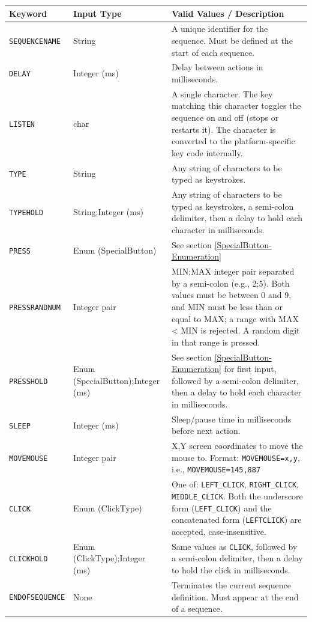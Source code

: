 \begin{table}[h]
	\centering
	\label{tab:sequencer_keywords}
	\begin{tabularx}{\textwidth}{|l|l|X|}
		\hline
		\textbf{Keyword} & \textbf{Input Type} & \textbf{Valid Values / Description} \\
		\hline
		\texttt{SEQUENCENAME} & String & A unique identifier for the sequence. Must be defined at the start of each sequence. \\
		\hline
		\texttt{DELAY} & Integer (ms) & Delay between actions in milliseconds.  \\
		\hline
		\texttt{LISTEN} & char & A single character. The key matching this character toggles the sequence on and off (stops or restarts it). The character is converted to the platform-specific key code internally. \\
		\hline
		\texttt{TYPE} & String & Any string of characters to be typed as keystrokes. \\
		\hline
		\texttt{TYPEHOLD} & String;Integer (ms) & Any string of characters to be typed as keystrokes, a semi-colon delimiter, then a delay to hold each character in milliseconds. \\
		\hline
		\texttt{PRESS} & Enum (SpecialButton) & See section \ref{SpecialButton-Enumeration}\\
		\hline
		\texttt{PRESSRANDNUM} & Integer pair & MIN;MAX integer pair separated by a semi-colon (e.g., 2;5). Both values must be between 0 and 9, and MIN must be less than or equal to MAX; a range with MAX < MIN is rejected. A random digit in that range is pressed. \\
		\hline
		\texttt{PRESSHOLD} & Enum (SpecialButton);Integer (ms) & See section \ref{SpecialButton-Enumeration} for first input, followed by a semi-colon delimiter, then a delay to hold each character in milliseconds.\\
		\hline
		\texttt{SLEEP} & Integer (ms) & Sleep/pause time in milliseconds before next action. \\
		\hline
		\texttt{MOVEMOUSE} & Integer pair & X,Y screen coordinates to move the mouse to. Format: \texttt{MOVEMOUSE=x,y}, i.e., \texttt{MOVEMOUSE=145,887} \\
		\hline
		\texttt{CLICK} & Enum (ClickType) & One of: \texttt{LEFT\_CLICK}, \texttt{RIGHT\_CLICK}, \texttt{MIDDLE\_CLICK}. Both the underscore form (\texttt{LEFT\_CLICK}) and the concatenated form (\texttt{LEFTCLICK}) are accepted, case-insensitive. \\
		\hline
		\texttt{CLICKHOLD} & Enum (ClickType);Integer (ms) & Same values as \texttt{CLICK}, followed by a semi-colon delimiter, then a delay to hold the click in milliseconds. \\
		\hline
		\texttt{ENDOFSEQUENCE} & None & Terminates the current sequence definition. Must appear at the end of a sequence. \\
		\hline
	\end{tabularx}
\end{table}

